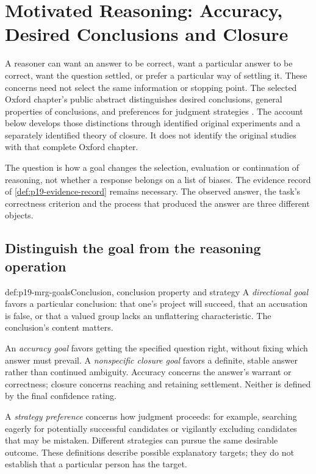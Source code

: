 \chapter{Motivated Reasoning: Accuracy, Desired Conclusions and Closure}
\label{sec:p19-motivated-reasoning-and-goals}

A reasoner can want an answer to be correct, want a particular answer to be
correct, want the question settled, or prefer a particular way of settling it.
These concerns need not select the same information or stopping point.
The selected Oxford chapter's public abstract distinguishes desired
conclusions, general properties of conclusions, and preferences for judgment
strategies \cite[abstract]{MoldenHiggins2012MotivatedThinkingMRG}.
The account below develops those distinctions through identified original
experiments and a separately identified theory of closure. It does not
identify the original studies with that complete Oxford chapter.

The question is how a goal changes the selection, evaluation or continuation
of reasoning, not whether a response belongs on a list of biases. The
evidence record of \cref{def:p19-evidence-record} remains necessary.
The observed answer, the task's correctness criterion and the process that
produced the answer are three different objects.

\section{Distinguish the goal from the reasoning operation}
\label{sec:p19-mrg-goals}

\begin{hbdefinition}{def:p19-mrg-goals}{Conclusion, conclusion property and strategy}
A \emph{directional goal} favors a particular conclusion: that one's project
will succeed, that an accusation is false, or that a valued group lacks an
unflattering characteristic. The conclusion's content matters.

An \emph{accuracy goal} favors getting the specified question right, without
fixing which answer must prevail. A \emph{nonspecific closure goal} favors a
definite, stable answer rather than continued ambiguity. Accuracy concerns
the answer's warrant or correctness; closure concerns reaching and retaining
settlement. Neither is defined by the final confidence rating.

A \emph{strategy preference} concerns how judgment proceeds: for example,
searching eagerly for potentially successful candidates or vigilantly
excluding candidates that may be mistaken. Different strategies can pursue
the same desirable outcome. These definitions describe possible explanatory
targets; they do not establish that a particular person has the target.
\end{hbdefinition}

